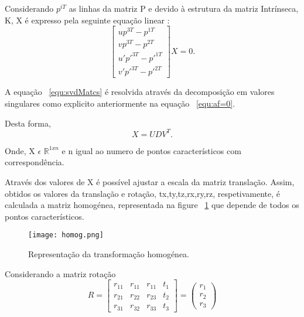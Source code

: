 	Considerando $p^{iT}$ as linhas da matriz P e devido à estrutura da matriz Intrínseca, K, X é expresso pela seguinte equação linear :  \begin{equation}\label{equ:svdMatcs} 
	\left[ \begin{array}{cccc}
	up^{3T} - p^{1T} \\
	vp^{3T} - p^{2T} \\
	u'p'^{3T} - p'^{1T} \\
	v'p'^{3T} - p'^{2T} 
	\end{array} \right] X = 0 .
	\end{equation}
	
	A equação ~\ref{equ:svdMatcs} é resolvida através da decomposição em valores singulares como explicito anteriormente na equação ~\ref{equ:af=0}.
	
	Desta forma, \[ X = UDV^T. \] 
	
	Onde, X $\epsilon$ $\mathbb{R}^{1xn}$ e n igual ao numero de pontos característicos com correspondência.
	
	Através dos valores de X é possível ajustar a escala da matriz translação. Assim, obtidos os valores da translação e rotação, tx,ty,tz,rx,ry,rz, respetivamente, é calculada a matriz homogénea, representada na figure ~\ref{fig:homog} que depende de todos os pontos característicos.
	
	\begin{figure}[h!] %
		\begin{center}
			\leavevmode		
			\texttt{[image: homog.png]}
			\caption{Representação da transformação homogénea.}
			\label{fig:homog}
		\end{center}
	\end{figure}

	\vspace{5mm}  %

	Considerando a matriz rotação \[  R = \left[ \begin{array}{cccc}
	r_{11} & r_{11} & r_{11} & t_1 \\ 
	r_{21} & r_{22} & r_{23} & t_2 \\ 
	r_{31} & r_{32} & r_{33} & t_3 
	\end{array} \right] = \left(\begin{array}{ccc}
	r_1 \\ r_2 \\ r_3
	\end{array}\right)\]
	
